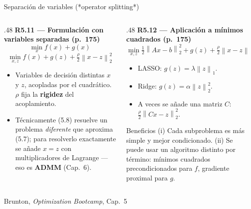 \documentclass[10pt,aspectratio=169]{beamer}
\newcommand{\fuente}{\vfill{\scriptsize\color{gray}Brunton, \emph{Optimization Bootcamp}, Cap.~5}}
\newcommand{\norm}[1]{\left\lVert #1 \right\rVert}
\begin{document}
\begin{frame}{Separación de variables (*operator splitting*)}
  \small
  \begin{columns}[T,onlytextwidth]
    \begin{column}{.48\textwidth}
      \textbf{R5.11 --- Formulación con variables separadas (p.~175)}
      \[
        \min_x f(x)+g(x) \tag{5.7}
      \]
      \[
        \min_{x,z} f(x) + g(z) + \tfrac{\rho}{2}\norm{x-z}_2^2 \tag{5.8}
      \]
      \begin{itemize}
        \item Variables de decisión distintas $x$ y $z$, acopladas por el
          cuadrático. $\rho$ fija la \textbf{rigidez} del acoplamiento.
        \item Técnicamente (5.8) resuelve un problema \emph{diferente} que
          aproxima (5.7); para resolverlo exactamente se añade $x=z$ con
          multiplicadores de Lagrange --- eso es \textbf{ADMM} (Cap.~6).
      \end{itemize}
    \end{column}
    \begin{column}{.48\textwidth}
      \textbf{R5.12 --- Aplicación a mínimos cuadrados (p.~175)}
      \[
        \min_{x,z} \tfrac{1}{2}\norm{Ax-b}_2^2 + g(z)
        + \tfrac{\rho}{2}\norm{x-z}_2^2 \tag{5.9}
      \]
      \begin{itemize}
        \item LASSO: $g(z)=\lambda\norm{z}_1$.
        \item Ridge: $g(z)=\alpha\norm{z}_2^2$.
        \item A veces se añade una matriz $C$: $\tfrac{\rho}{2}\norm{Cx-z}_2^2$.
      \end{itemize}
      \begin{block}{Beneficios}
        \small
        (i) Cada subproblema es más simple y mejor condicionado.
        (ii) Se puede usar un algoritmo distinto por término: mínimos
        cuadrados precondicionados para $f$, gradiente proximal para $g$.
      \end{block}
    \end{column}
  \end{columns}
  \fuente
\end{frame}
\end{document}
